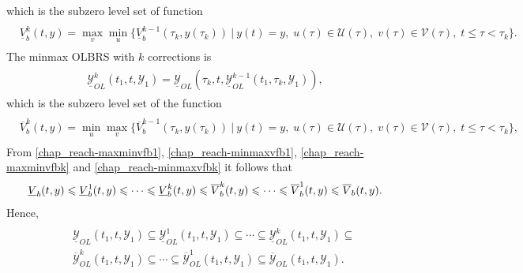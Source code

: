 \documentclass[letterpaper,10pt,english]{sphinxmanual}
\begin{document}
which is the subzero level set of function
\label{chap_reach:equation-maxminvfbk}\begin{gather}
\begin{split}\begin{aligned}
\underline{V}^k_b(t, y) =  \max_v\min_u\{\underline{V}^{k-1}_b(\tau_k, y(\tau_k)) ~|~
y(t)=y, \; u(\tau)\in{\mathcal U}(\tau), \;
v(\tau)\in{\mathcal V}(\tau), \; t\leqslant\tau<\tau_k\}.
\end{aligned}\end{split}\label{chap_reach-maxminvfbk}
\end{gather}
The minmax OLBRS with $k$ corrections is
\label{chap_reach:equation-minmaxbk}\begin{gather}
\begin{split}\underline{{\mathcal Y}}_{OL}^k(t_1, t, {\mathcal Y}_1) = \underline{{\mathcal Y}}_{OL}(\tau_k, t, \underline{{\mathcal Y}}_{OL}^{k-1}(t_1, \tau_k, {\mathcal Y}_1)),\end{split}\label{chap_reach-minmaxbk}
\end{gather}
which is the subzero level set of the function
\label{chap_reach:equation-minmaxvfbk}\begin{gather}
\begin{split}\begin{aligned}
\overline{V}^k_b(t, y) =  \min_u\max_v\{\overline{V}^{k-1}_b(\tau_k, y(\tau_k)) ~|~
y(t)=y, \; u(\tau)\in{\mathcal U}(\tau), \;
v(\tau)\in{\mathcal V}(\tau), \; t\leqslant\tau<\tau_k\},
\end{aligned}\end{split}\label{chap_reach-minmaxvfbk}
\end{gather}
From \eqref{chap_reach-maxminvfb1}, \eqref{chap_reach-minmaxvfb1}, \eqref{chap_reach-maxminvfbk} and \eqref{chap_reach-minmaxvfbk}
it follows that
\begin{gather}
\begin{split}\underline{V}_b(t, y) \leqslant\underline{V}^1_b(t, y)\leqslant\cdots
\leqslant\underline{V}^k_b(t, y) \leqslant\overline{V}^k_b(t, y) \leqslant\cdots
\leqslant\overline{V}^1_b(t, y) \leqslant\overline{V}_b(t, y) .\end{split}\notag
\end{gather}
Hence,
\label{chap_reach:equation-olbrsinclusion}\begin{gather}
\begin{split}\begin{aligned}
&&\underline{{\mathcal Y}}_{OL}(t_1, t, {\mathcal Y}_1) \subseteq \underline{{\mathcal Y}}_{OL}^1(t_1, t, {\mathcal Y}_1) \subseteq \cdots
\subseteq \underline{{\mathcal Y}}_{OL}^k(t_1, t, {\mathcal Y}_1) \subseteq \nonumber \\
&&\overline{{\mathcal Y}}_{OL}^k(t_1, t, {\mathcal Y}_1) \subseteq \cdots \subseteq \overline{{\mathcal Y}}_{OL}^1(t_1, t, {\mathcal Y}_1)
\subseteq \overline{{\mathcal Y}}_{OL}(t_1, t, {\mathcal Y}_1) .
\end{aligned}\end{split}\label{chap_reach-olbrsinclusion}
\end{gather}
\end{document}
